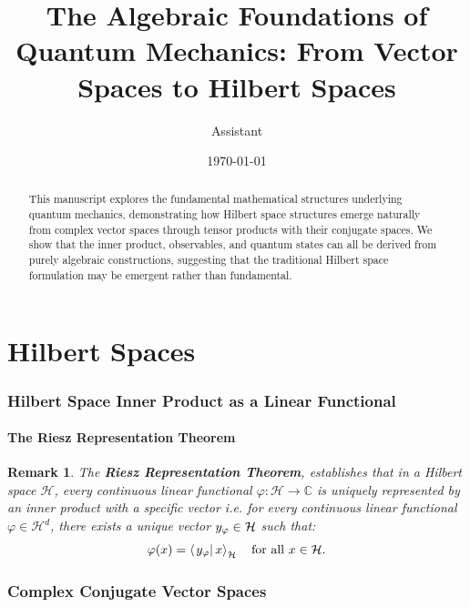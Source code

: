 \documentclass[aps,preprint]{revtex4}
\newtheorem{remark}[theorem]{Remark}
\begin{document}
\title{The Algebraic Foundations of Quantum Mechanics: From Vector Spaces to
Hilbert Spaces}
\author{Assistant}
\date{\today }

\begin{abstract}
This manuscript explores the fundamental mathematical structures underlying
quantum mechanics, demonstrating how Hilbert space structures emerge
naturally from complex vector spaces through tensor products with their
conjugate spaces. We show that the inner product, observables, and quantum
states can all be derived from purely algebraic constructions, suggesting
that the traditional Hilbert space formulation may be emergent rather than
fundamental.
\end{abstract}

\maketitle

\part{Hilbert Spaces}

\section{Hilbert Space Inner Product as a Linear Functional}

\subsection{The Riesz Representation Theorem}

\begin{remark}
The \textbf{Riesz Representation Theorem}, establishes that in a Hilbert
space $\mathcal{H}$, every continuous linear functional $\varphi :\mathcal{H}%
\rightarrow \mathbb{C}$ is uniquely represented by an inner product with a
specific vector i.e. for every continuous \emph{linear }functional $\varphi
\in \mathcal{H}^{d}$, there exists a unique vector $y_{\varphi }\in \mathcal{%
H}$ such that: 
\begin{equation}
\varphi (x)=\left\langle \left. y_{\varphi }\right\vert x\right\rangle _{%
\mathcal{H}}\quad \text{for all }x\in \mathcal{H}.
\end{equation}
\end{remark}

\section{Complex Conjugate Vector Spaces}
\end{document}
